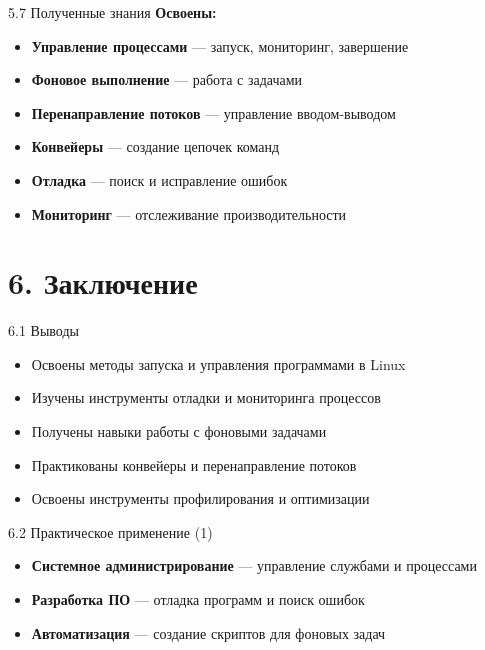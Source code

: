 \documentclass[
  ignorenonframetext,
  aspectratio=169,
  russian,
]{beamer}
\providecommand{\tightlist}{%
  \setlength{\itemsep}{0pt}\setlength{\parskip}{0pt}}
\begin{document}
\begin{frame}{5.7 Полученные знания}
\label{ux43fux43eux43bux443ux447ux435ux43dux43dux44bux435-ux437ux43dux430ux43dux438ux44f}
\textbf{Освоены:}

\begin{itemize}[<+->]
\tightlist
\item
  \textbf{Управление процессами} --- запуск, мониторинг, завершение
\item
  \textbf{Фоновое выполнение} --- работа с задачами
\item
  \textbf{Перенаправление потоков} --- управление вводом-выводом
\item
  \textbf{Конвейеры} --- создание цепочек команд
\item
  \textbf{Отладка} --- поиск и исправление ошибок
\item
  \textbf{Мониторинг} --- отслеживание производительности
\end{itemize}
\end{frame}

\section{6. Заключение}\label{ux437ux430ux43aux43bux44eux447ux435ux43dux438ux435}

\begin{frame}{6.1 Выводы}
\label{ux432ux44bux432ux43eux434ux44b}
\begin{itemize}[<+->]
\tightlist
\item
  Освоены методы запуска и управления программами в Linux
\item
  Изучены инструменты отладки и мониторинга процессов
\item
  Получены навыки работы с фоновыми задачами
\item
  Практикованы конвейеры и перенаправление потоков
\item
  Освоены инструменты профилирования и оптимизации
\end{itemize}
\end{frame}

\begin{frame}{6.2 Практическое применение (1)}
\label{ux43fux440ux430ux43aux442ux438ux447ux435ux441ux43aux43eux435-ux43fux440ux438ux43cux435ux43dux435ux43dux438ux435-1}
\begin{itemize}[<+->]
\tightlist
\item
  \textbf{Системное администрирование} --- управление службами и
  процессами
\item
  \textbf{Разработка ПО} --- отладка программ и поиск ошибок
\item
  \textbf{Автоматизация} --- создание скриптов для фоновых задач
\end{itemize}
\end{frame}
\end{document}
